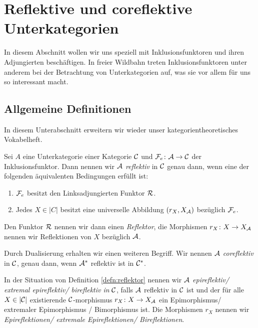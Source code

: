 \section{Reflektive und coreflektive Unterkategorien}

In diesem Abschnitt wollen wir uns speziell mit Inklusionsfunktoren und ihren Adjungierten beschäftigen. 
In freier Wildbahn treten Inklusionsfunktoren unter anderem bei der Betrachtung von Unterkategorien auf, was sie vor allem für uns so interessant macht.

\subsection{Allgemeine Definitionen}

In diesem Unterabschnitt erweitern wir wieder unser kategorientheoretisches Vokabelheft.

\begin{defn}
  \label{defn:reflektor}
  Sei $A$ eine Unterkategorie einer Kategorie $\mathcal{C}$ und $\mathcal{F}_e \colon \mathcal{A} \to \mathcal{C}$ der Inklusionsfunktor.
  Dann nennen wir $\mathcal{A}$ \emph{reflektiv} in $\mathcal{C}$ genau dann, wenn eine der folgenden äquivalenten Bedingungen erfüllt ist:
  \begin{enumerate}[(1)]
    \item $\mathcal{F}_e$ besitzt den Linksadjungierten Funktor $\mathcal{R}$.
    \item Jedes $X \in |C|$ besitzt eine universelle Abbildung $(r_X, X_{\mathcal{A}})$ bezüglich $\mathcal{F}_e$.
  \end{enumerate}
  Den Funktor $\mathcal{R}$ nennen wir dann einen \emph{Reflektor}, die Morphismen $r_X \colon X \to X_{\mathcal{A}}$ nennen wir Reflektionen von $X$ bezüglich $\mathcal{A}$.

  Durch Dualisierung erhalten wir einen weiteren Begriff.
  Wir nennen $\mathcal{A}$ \emph{coreflektiv} in $\mathcal{C}$, genau dann, wenn $\mathcal{A}^*$ reflektiv ist in $\mathcal{C}^*$. 
\end{defn}

\begin{defn}
  In der Situation von Definition \ref{defn:reflektor} nennen wir $\mathcal{A}$ \emph{epireflektiv/ extremal epireflektiv/ bireflektiv in} $\mathcal{C}$, falls $\mathcal{A}$ reflektiv in $\mathcal{C}$ ist und der für alle $X \in |\mathcal{C}|$ existierende $\mathcal{C}$-morphismus $r_X \colon X \to X_{\mathcal{A}}$ ein Epimorphismus/ extremaler Epimorphismus / Bimorphismus ist.
  Die Morphismen $r_X$ nennen wir \emph{Epireflektionen/ extremale Epireflektionen/ Bireflektionen}.
\end{defn}

